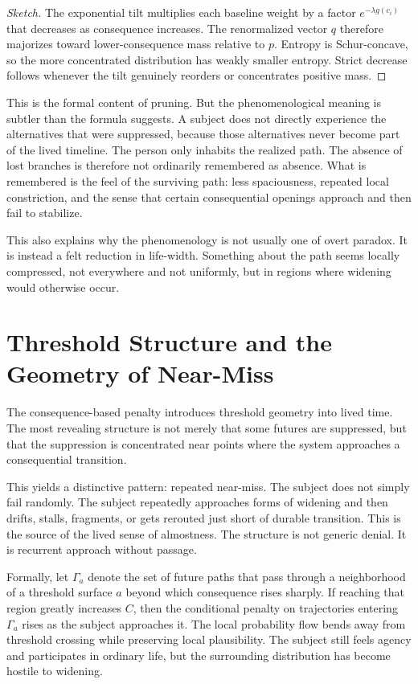 \documentclass[12pt]{article}
\begin{document}
\begin{proof}[Sketch]
The exponential tilt multiplies each baseline weight by a factor $e^{-\lambda g(c_i)}$ that decreases as consequence increases. The renormalized vector $q$ therefore majorizes toward lower-consequence mass relative to $p$. Entropy is Schur-concave, so the more concentrated distribution has weakly smaller entropy. Strict decrease follows whenever the tilt genuinely reorders or concentrates positive mass.
\end{proof}

This is the formal content of pruning. But the phenomenological meaning is subtler than the formula suggests. A subject does not directly experience the alternatives that were suppressed, because those alternatives never become part of the lived timeline. The person only inhabits the realized path. The absence of lost branches is therefore not ordinarily remembered as absence. What is remembered is the feel of the surviving path: less spaciousness, repeated local constriction, and the sense that certain consequential openings approach and then fail to stabilize.

This also explains why the phenomenology is not usually one of overt paradox. It is instead a felt reduction in life-width. Something about the path seems locally compressed, not everywhere and not uniformly, but in regions where widening would otherwise occur.

\section{Threshold Structure and the Geometry of Near-Miss}

The consequence-based penalty introduces threshold geometry into lived time. The most revealing structure is not merely that some futures are suppressed, but that the suppression is concentrated near points where the system approaches a consequential transition.

This yields a distinctive pattern: repeated near-miss. The subject does not simply fail randomly. The subject repeatedly approaches forms of widening and then drifts, stalls, fragments, or gets rerouted just short of durable transition. This is the source of the lived sense of almostness. The structure is not generic denial. It is recurrent approach without passage.

Formally, let $\Gamma_a$ denote the set of future paths that pass through a neighborhood of a threshold surface $a$ beyond which consequence rises sharply. If reaching that region greatly increases $C$, then the conditional penalty on trajectories entering $\Gamma_a$ rises as the subject approaches it. The local probability flow bends away from threshold crossing while preserving local plausibility. The subject still feels agency and participates in ordinary life, but the surrounding distribution has become hostile to widening.
\end{document}
